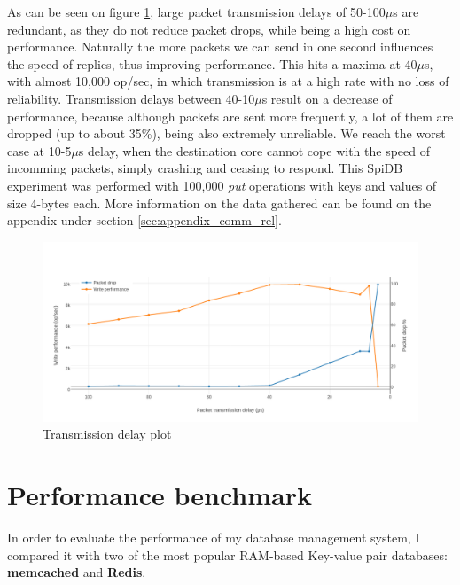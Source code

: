 As can be seen on figure \ref{fig:transmission-delay}, large packet transmission delays of 50-100$\mu$s are redundant, as they do not reduce packet drops, while being a high cost on performance. Naturally the more packets we can send in one second influences the speed of replies, thus improving performance. This hits a maxima at 40$\mu$s, with almost 10,000 op/sec, in which transmission is at a high rate with no loss of reliability. Transmission delays between 40-10$\mu$s result on a decrease of performance, because although packets are sent more frequently, a lot of them are dropped (up to about 35\%), being also extremely unreliable. We reach the worst case at 10-5$\mu$s delay, when the destination core cannot cope with the speed of incomming packets, simply crashing and ceasing to respond. This SpiDB experiment was performed with 100,000 \textit{put} operations with keys and values of size 4-bytes each. More information on the data gathered can be found on the appendix under section \ref{sec:appendix_comm_rel}.

\begin{figure}
\begin{center}
	\includegraphics[width=1.4\textwidth, natwidth=1063, natheight=509]{images/transmission_delay.png}
\end{center}
\caption{Transmission delay plot}
\label{fig:transmission-delay}
\end{figure}


\section{Performance benchmark}

\iffalse
In order to evaluate the performance of my database management system, I compared it with two of the most popular RAM-based Key-value pair databases: \textbf{memcached} and \textbf{Redis}.

